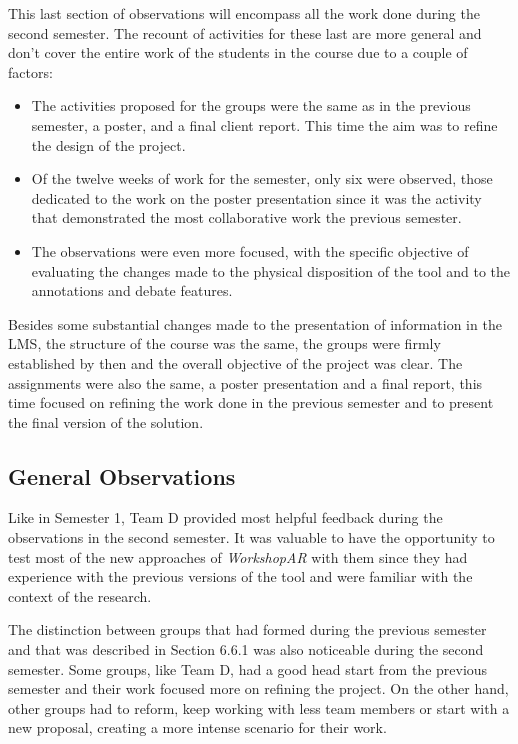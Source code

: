 This last section of observations will encompass all the work done during the second semester. The recount of activities for these last are more general and don't cover
the entire work of the students in the course due to a couple of factors:

\begin{itemize}
    \item The activities proposed for the groups were the same as in the previous semester, a poster, and a final client report. This time the aim was to refine the design
    of the project.
    \item Of the twelve weeks of work for the semester, only six were observed, those dedicated to the work on the poster presentation since it was the activity that
    demonstrated the most collaborative work the previous semester.
    \item The observations were even more focused, with the specific objective of evaluating the changes made to the physical disposition of the tool and to the annotations
    and debate features.
\end{itemize}

Besides some substantial changes made to the presentation of information in the \ac{LMS}, the structure of the course was the same, the groups were firmly established by
then and the overall objective of the project was clear. The assignments were also the same, a poster presentation and a final report, this time focused on refining the
work done in the previous semester and to present the final version of the solution.

\subsection{General Observations \label{sec:6-8-1}}

Like in Semester 1, Team D provided most helpful feedback during the observations in the second semester. It was valuable to have the opportunity to test most of the new
approaches of \emph{WorkshopAR} with them since they had experience with the previous versions of the tool and were familiar with the context of the research.

The distinction between groups that had formed during the previous semester and that was described in Section 6.6.1 was also noticeable during the second semester. Some
groups, like Team D, had a good head start from the previous semester and their work focused more on refining the project. On the other hand, other groups had to reform,
keep working with less team members or start with a new proposal, creating a more intense scenario for their work.

